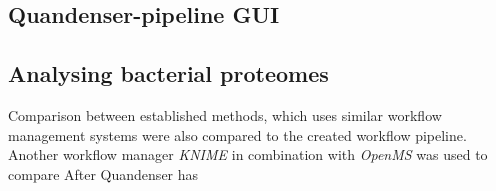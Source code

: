 \subsection{Quandenser-pipeline GUI}


\subsection{Analysing bacterial proteomes}

Comparison between established methods, which uses similar workflow management systems were also compared to the created workflow pipeline. Another workflow manager \textit{KNIME} in combination with \textit{OpenMS} was used to compare
After Quandenser has
